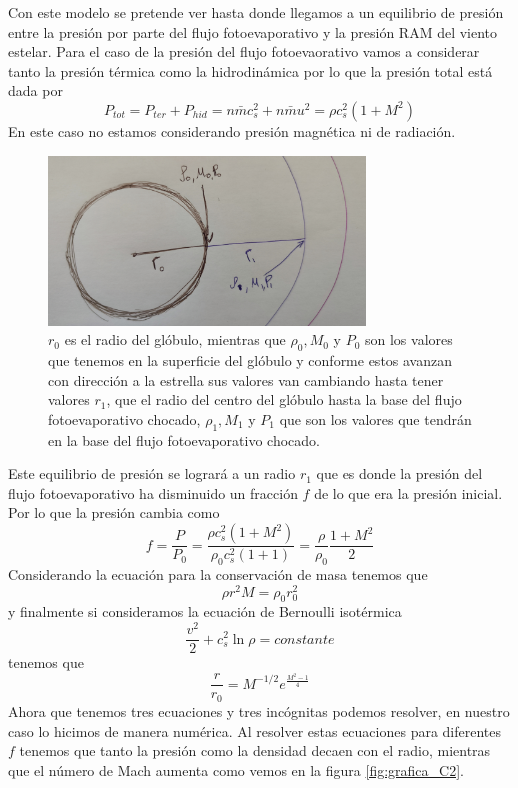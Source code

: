 \documentclass{book}
\begin{document}
Con este modelo se pretende ver hasta donde llegamos a un equilibrio de presión entre la presión por parte del flujo fotoevaporativo y la presión RAM del viento estelar. Para el caso de la presión del flujo fotoevaorativo vamos a considerar tanto la presión térmica como la hidrodinámica por lo que la presión total está dada por
\[P_{tot}=P_{ter}+P_{hid}=n\bar{m}c_s^2+n\bar{m}u^2=\rho c_s^2(1+M^2)\]
En este caso no estamos considerando presión magnética ni de radiación.

\begin{figure}[h]
    \centering \includegraphics[width=0.75\textwidth]{images Chapter 2/C2_parameters.jpg}
    \caption{$r_0$ es el radio del glóbulo, mientras que $\rho_0,M_0$ y $P_0$ son los valores que tenemos en la superficie del glóbulo y conforme estos avanzan con dirección a la estrella sus valores van cambiando hasta tener valores $r_1$, que el radio del centro del glóbulo hasta la base del flujo fotoevaporativo chocado, $\rho_1,M_1$ y $P_1$ que son los valores que tendrán en la base del flujo fotoevaporativo chocado.}
    \label{fig:parameters}
\end{figure}

Este equilibrio de presión se logrará a un radio $r_1$ que es donde la presión del flujo fotoevaporativo ha disminuido un fracción $f$ de lo que era la presión inicial. Por lo que la presión cambia como 
\[f=\frac{P}{P_0}=\frac{\rho c_s^2(1+M^2)}{\rho_0 c_s^2(1+1)}=\frac{\rho}{\rho_0}\frac{1+M^2}{2}\]
Considerando la ecuación para la conservación de masa tenemos que
\[\rho r^2M	=\rho_0 r_0^2\]
y finalmente si consideramos la ecuación de Bernoulli isotérmica 
\[\frac{v^2}{2}+c_s^2\ln\rho=constante\]
tenemos que 
\[\frac{r}{r_0}=M^{-1/2}e^{\frac{M^2-1}{4}}\]
Ahora que tenemos tres ecuaciones y tres incógnitas podemos resolver, en nuestro caso lo hicimos de manera numérica. Al resolver estas ecuaciones para diferentes $f$ tenemos que tanto la presión como la densidad decaen con el radio, mientras que el número de Mach aumenta como vemos en la figura \ref{fig:grafica_C2}.
\end{document}
